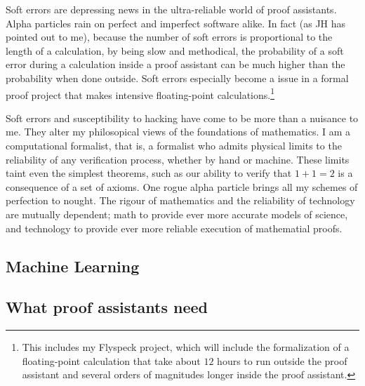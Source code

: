 \documentclass{llncs}
\begin{document}
Soft errors are depressing news in the ultra-reliable world of proof
assistants.  Alpha particles rain on perfect and imperfect software
alike.  In fact (as JH has pointed out to me), because the number of
soft errors is proportional to the length of a calculation, by being
slow and methodical, the probability of a soft error during a
calculation inside a proof assistant can be much higher than the
probability when done outside.  
Soft errors especially become a issue in a formal proof project that
makes intensive floating-point calculations.\footnote{This includes my
  Flyspeck project, which will include the formalization of a
  floating-point calculation that take about $12$ hours to run outside the
  proof assistant and several orders of magnitudes longer inside the proof assistant.}

Soft errors and susceptibility to hacking
have come to be more than a nuisance to me.  They alter my
philosopical views of the foundations of mathematics.  I am a
computational formalist, that is, a formalist who admits physical
limits to the reliability of any verification process, whether by hand
or machine.  These limits taint even the simplest theorems, such as
our ability to verify that $1+1=2$ is a consequence of a set of
axioms.  One rogue alpha particle brings all my schemes of
perfection to nought.  %
The rigour of
mathematics and the reliability of technology are mutually dependent;
math to provide ever more accurate models of science, and technology
to provide ever more reliable execution of mathematial proofs.



\subsection{Machine Learning}

\subsection{What proof assistants need}
\end{document}
